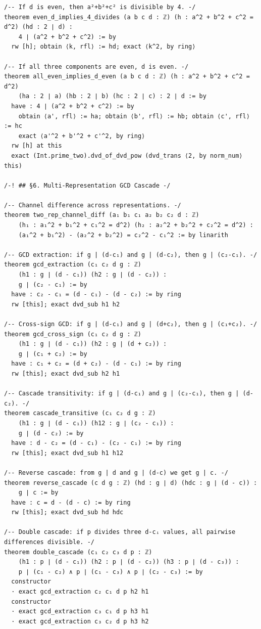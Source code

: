 \documentclass[11pt,openany]{book}
\theoremstyle{definition}
\theoremstyle{plain}
\theoremstyle{remark}
\begin{document}
\begin{lstlisting}[style=lean]
/-- If d is even, then a²+b²+c² is divisible by 4. -/
theorem even_d_implies_4_divides (a b c d : ℤ) (h : a^2 + b^2 + c^2 = d^2) (hd : 2 ∣ d) :
    4 ∣ (a^2 + b^2 + c^2) := by
  rw [h]; obtain ⟨k, rfl⟩ := hd; exact ⟨k^2, by ring⟩

/-- If all three components are even, d is even. -/
theorem all_even_implies_d_even (a b c d : ℤ) (h : a^2 + b^2 + c^2 = d^2)
    (ha : 2 ∣ a) (hb : 2 ∣ b) (hc : 2 ∣ c) : 2 ∣ d := by
  have : 4 ∣ (a^2 + b^2 + c^2) := by
    obtain ⟨a', rfl⟩ := ha; obtain ⟨b', rfl⟩ := hb; obtain ⟨c', rfl⟩ := hc
    exact ⟨a'^2 + b'^2 + c'^2, by ring⟩
  rw [h] at this
  exact (Int.prime_two).dvd_of_dvd_pow (dvd_trans ⟨2, by norm_num⟩ this)

/-! ## §6. Multi-Representation GCD Cascade -/

/-- Channel difference across representations. -/
theorem two_rep_channel_diff (a₁ b₁ c₁ a₂ b₂ c₂ d : ℤ)
    (h₁ : a₁^2 + b₁^2 + c₁^2 = d^2) (h₂ : a₂^2 + b₂^2 + c₂^2 = d^2) :
    (a₁^2 + b₁^2) - (a₂^2 + b₂^2) = c₂^2 - c₁^2 := by linarith

/-- GCD extraction: if g | (d-c₁) and g | (d-c₂), then g | (c₂-c₁). -/
theorem gcd_extraction (c₁ c₂ d g : ℤ)
    (h1 : g ∣ (d - c₁)) (h2 : g ∣ (d - c₂)) :
    g ∣ (c₂ - c₁) := by
  have : c₂ - c₁ = (d - c₁) - (d - c₂) := by ring
  rw [this]; exact dvd_sub h1 h2

/-- Cross-sign GCD: if g | (d-c₁) and g | (d+c₂), then g | (c₁+c₂). -/
theorem gcd_cross_sign (c₁ c₂ d g : ℤ)
    (h1 : g ∣ (d - c₁)) (h2 : g ∣ (d + c₂)) :
    g ∣ (c₁ + c₂) := by
  have : c₁ + c₂ = (d + c₂) - (d - c₁) := by ring
  rw [this]; exact dvd_sub h2 h1

/-- Cascade transitivity: if g | (d-c₁) and g | (c₂-c₁), then g | (d-c₂). -/
theorem cascade_transitive (c₁ c₂ d g : ℤ)
    (h1 : g ∣ (d - c₁)) (h12 : g ∣ (c₂ - c₁)) :
    g ∣ (d - c₂) := by
  have : d - c₂ = (d - c₁) - (c₂ - c₁) := by ring
  rw [this]; exact dvd_sub h1 h12

/-- Reverse cascade: from g | d and g | (d-c) we get g | c. -/
theorem reverse_cascade (c d g : ℤ) (hd : g ∣ d) (hdc : g ∣ (d - c)) :
    g ∣ c := by
  have : c = d - (d - c) := by ring
  rw [this]; exact dvd_sub hd hdc

/-- Double cascade: if p divides three d-cᵢ values, all pairwise differences divisible. -/
theorem double_cascade (c₁ c₂ c₃ d p : ℤ)
    (h1 : p ∣ (d - c₁)) (h2 : p ∣ (d - c₂)) (h3 : p ∣ (d - c₃)) :
    p ∣ (c₁ - c₂) ∧ p ∣ (c₁ - c₃) ∧ p ∣ (c₂ - c₃) := by
  constructor
  · exact gcd_extraction c₂ c₁ d p h2 h1
  constructor
  · exact gcd_extraction c₃ c₁ d p h3 h1
  · exact gcd_extraction c₃ c₂ d p h3 h2


\end{lstlisting}
\end{document}
